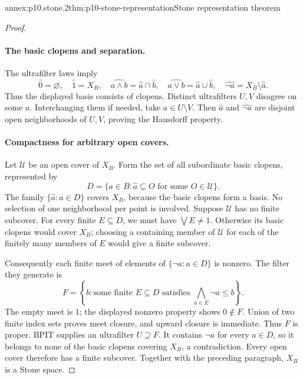\begin{annexitem}{annex:p10.stone.2}{thm:p10-stone-representation}{Stone representation theorem}
\begin{proof}
\paragraph{The basic clopens and separation.}
The ultrafilter laws imply
\[
 \widehat0=\varnothing,\quad \widehat1=X_B,\quad
 \widehat{a\wedge b}=\widehat a\cap\widehat b,\quad
 \widehat{a\vee b}=\widehat a\cup\widehat b,\quad
 \widehat{\neg a}=X_B\setminus\widehat a.
\]
Thus the displayed basis consists of clopens.
Distinct ultrafilters \(U,V\) disagree on some \(a\).
Interchanging them if needed, take \(a\in U\setminus V\).
Then \(\widehat a\) and \(\widehat{\neg a}\) are disjoint open
neighborhoods of \(U,V\), proving the Hausdorff property.

\paragraph{Compactness for arbitrary open covers.}
Let \(\mathcal U\) be an open cover of \(X_B\).
Form the set of all subordinate basic clopens, represented by
\[
 D=\{a\in B:\widehat a\subseteq O
                      \text{ for some }O\in\mathcal U\}.
\]
The family \(\{\widehat a:a\in D\}\) covers \(X_B\), because the
basic clopens form a basis. No selection of one neighborhood per
point is involved.
Suppose \(\mathcal U\) has no finite subcover.
For every finite \(E\subseteq D\), we must have
\(\bigvee E\ne1\).
Otherwise its basic clopens would cover \(X_B\); choosing a
containing member of \(\mathcal U\) for each of the finitely many
members of \(E\) would give a finite subcover.

Consequently each finite meet of elements of
\(\{\neg a:a\in D\}\) is nonzero.
The filter they generate is
\[
 F=\left\{b:\text{some finite }E\subseteq D
                  \text{ satisfies }\bigwedge_{a\in E}\neg a\leq b\right\}.
\]
The empty meet is \(1\); the displayed nonzero property shows
\(0\notin F\).
Union of two finite index sets proves meet closure, and upward
closure is immediate.
Thus \(F\) is proper.
BPIT supplies an ultrafilter \(U\supseteq F\).
It contains \(\neg a\) for every \(a\in D\), so it belongs to
none of the basic clopens covering \(X_B\), a contradiction.
Every open cover therefore has a finite subcover.
Together with the preceding paragraph, \(X_B\) is a Stone space.


\end{proof}
\end{annexitem}
